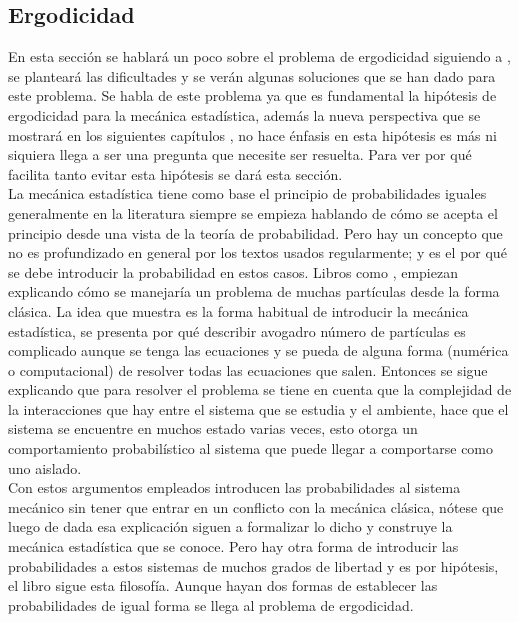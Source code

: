 \subsection{Ergodicidad}
En esta sección se hablará un poco sobre el problema de ergodicidad siguiendo a \cite{TodaStat}, se planteará las dificultades y se verán algunas soluciones que se han dado para este problema. Se habla de este problema ya que es fundamental la hipótesis de ergodicidad para la mecánica estadística, además la nueva perspectiva que se mostrará en los siguientes capítulos \cite{Popescu2006}, no hace énfasis en esta hipótesis es más ni siquiera llega a ser una pregunta que necesite ser resuelta. Para ver por qué facilita tanto evitar esta hipótesis se dará esta sección.
\\
La mecánica estadística tiene como base el principio de probabilidades iguales generalmente en la literatura siempre se empieza hablando de cómo se acepta el principio desde una vista de la teoría de probabilidad. Pero hay un concepto que no es profundizado en general por los textos usados regularmente; y es el por qué se debe introducir la probabilidad en estos casos. Libros como \cite{HuangStat},\cite{LandauStat} empiezan explicando cómo se manejaría un problema de muchas partículas desde la forma clásica. La idea que muestra es la forma habitual de introducir la mecánica estadística, se presenta por qué describir avogadro número de partículas es complicado aunque se  tenga las ecuaciones y se pueda de alguna forma (numérica o computacional) de resolver todas las ecuaciones que salen. Entonces se sigue explicando que para resolver el problema se tiene en cuenta que la complejidad de la interacciones que hay entre el sistema que se estudia y el ambiente, hace que el sistema se encuentre en muchos estado varias veces, esto otorga un comportamiento probabilístico al sistema que puede llegar a comportarse como uno aislado.
\\ 
Con estos argumentos empleados introducen las probabilidades al sistema mecánico sin tener que entrar en un conflicto con la mecánica clásica, nótese que luego de dada esa explicación siguen a formalizar lo dicho y construye la mecánica estadística que se conoce. Pero hay otra forma de introducir las probabilidades a estos sistemas de muchos grados de libertad y es por hipótesis, el libro \cite{KhinchinStat} sigue esta filosofía. Aunque hayan dos formas de establecer las probabilidades de igual forma se llega al problema de ergodicidad. 
\\
